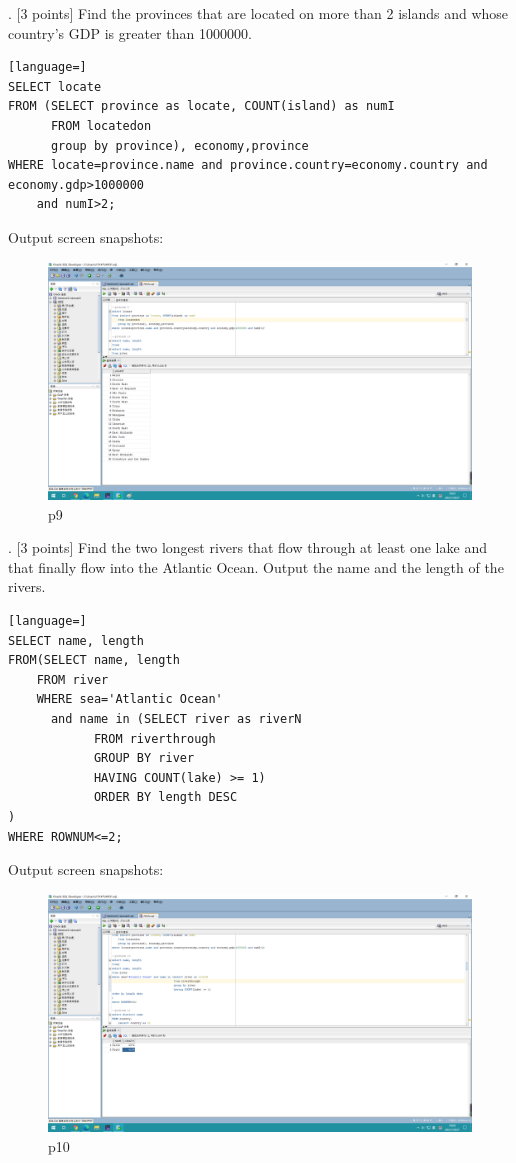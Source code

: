 \documentclass[]{article}
\begin{document}
	. [3 points] Find the provinces that are located on more than 2 islands and whose country’s GDP is greater than 1000000.   \\
	
	\begin{lstlisting}[language=] 
SELECT locate
FROM (SELECT province as locate, COUNT(island) as numI
	  FROM locatedon
	  group by province), economy,province
WHERE locate=province.name and province.country=economy.country and economy.gdp>1000000 
	and numI>2;
	\end{lstlisting} 
	Output screen snapshots:
	\begin{figure}[H]
		\centering
		\includegraphics[width=0.8\linewidth]{../screen/p9}
		\caption{p9}
		\label{fig:p9}
	\end{figure}
	
	. [3 points] Find the two longest rivers that flow through at least one lake and that finally flow into the Atlantic Ocean. Output the name and the length of the rivers.  \\
	
	\begin{lstlisting}[language=] 
SELECT name, length
FROM(SELECT name, length
	FROM river
	WHERE sea='Atlantic Ocean' 
	  and name in (SELECT river as riverN
			FROM riverthrough
			GROUP BY river
			HAVING COUNT(lake) >= 1)
			ORDER BY length DESC
)
WHERE ROWNUM<=2;
	\end{lstlisting} 
	Output screen snapshots:
	\begin{figure}[H]
		\centering
		\includegraphics[width=0.75\linewidth]{../screen/p10}
		\caption{p10}
		\label{fig:p10}
	\end{figure}
	
\end{document}
